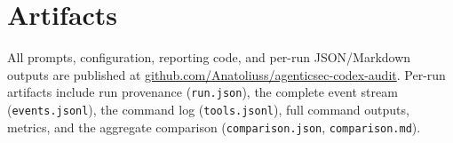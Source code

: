 \documentclass[11pt]{article}
\newcommand{\repo}{\href{https://github.com/Anatoliuss/agenticsec-codex-audit}{github.com/Anatoliuss/agenticsec-codex-audit}}
\begin{document}
\section*{Artifacts}
All prompts, configuration, reporting code, and per-run JSON/Markdown outputs are published
at \repo. Per-run artifacts include run provenance (\texttt{run.json}), the complete event
stream (\texttt{events.jsonl}), the command log (\texttt{tools.jsonl}), full command outputs,
metrics, and the aggregate comparison (\texttt{comparison.json}, \texttt{comparison.md}).
\end{document}
